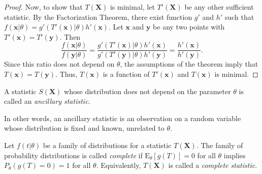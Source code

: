 \begin{proof}
Now, to show that $T(\mathbf{X})$ is minimal, let $T'(\mathbf{X})$ be any other sufficient statistic.
By the Factorization Theorem, there exist function $g'$ and $h'$ such that $f(\mathbf{x}|\theta) = g'(T'(\mathbf{x})|\theta)h'(\mathbf{x})$.
Let $\mathbf{x}$ and $\mathbf{y}$ be any two points with $T'(\mathbf{x}) = T'(\mathbf{y})$.
Then
\begin{equation*}
\frac{ f(\mathbf{x}|\theta) }{ f(\mathbf{y}|\theta) }
= \frac{ g'(T'(\mathbf{x})|\theta)h'(\mathbf{x}) }{ g'(T'(\mathbf{y})|\theta)h'(\mathbf{y}) }
= \frac{ h'(\mathbf{x}) }{ h'(\mathbf{y}) } .
\end{equation*}
Since this ratio does not depend on $\theta$, the assumptions of the theorem imply that $T(\mathbf{x}) = T(\mathbf{y})$.
Thus, $T(\mathbf{x})$ is a function of $T'(\mathbf{x})$ and $T(\mathbf{x})$ is minimal.
\end{proof}

\begin{definition}
A statistic $S(\mathbf{X})$ whose distribution does not depend on the parameter $\theta$ is called an \emph{ancillary statistic}.
\end{definition}

In other words, an ancillary statistic is an observation on a random variable whose distribution is fixed and known, unrelated to $\theta$.

\begin{definition}
Let $f(t|\theta)$ be a family of distributions for a statistic $T(\mathbf{X})$.
The family of probability distributions is called \emph{complete} if $\mathrm{E}_{\theta} [g(T)] = 0$ for all $\theta$ implies $P_{\theta} (g(T) = 0) = 1$ for all $\theta$.
Equivalently, $T(\mathbf{X})$ is called a \emph{complete statistic}.
\end{definition}


